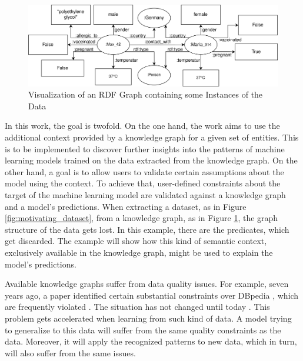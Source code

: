    \begin{figure}
        \centering
        \includegraphics[width=\textwidth]{images/motivating_example/Dataset Covid-19 Part.png}
        \caption{Visualization of an RDF Graph containing some Instances of the Data}
        \label{fig:motivating_example_kg}
    \end{figure}
    
    In this work, the goal is twofold. On the one hand, the work aims to use the additional context provided by a knowledge graph for a given set of entities. This is to be implemented to discover further insights into the patterns of machine learning models trained on the data extracted from the knowledge graph. On the other hand, a goal is to allow users to validate certain assumptions about the model using the context. To achieve that, user-defined constraints about the target of the machine learning model are validated against a knowledge graph and a model's predictions. When extracting a dataset, as in Figure \ref{fig:motivating_dataset}, from a knowledge graph, as in Figure \ref{fig:motivating_example_kg}, the graph structure of the data gets lost. In this example, there are the  predicates, which get discarded. The example will show how this kind of semantic context, exclusively available in the knowledge graph, might be used to explain the model's predictions.
    
    Available knowledge graphs suffer from data quality issues. For example, seven years ago, a paper identified certain substantial constraints over DBpedia \cite{mendes2012dbpedia}, which are frequently violated \cite{Kontokostas2014}. The situation has not changed until today \cite{valSPARQL}. This problem gets accelerated when learning from such kind of data. A model trying to generalize to this data will suffer from the same quality constraints as the data. Moreover, it will apply the recognized patterns to new data, which in turn, will also suffer from the same issues.
    
